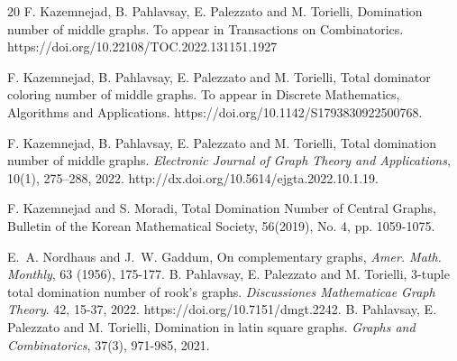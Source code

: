 \documentclass[a4paper,12pt, reqno]{amsart}
\begin{document}
\begin{thebibliography}{20}
 F. Kazemnejad, B. Pahlavsay, E. Palezzato and M. Torielli, Domination number of middle graphs. To appear in Transactions on Combinatorics. https://doi.org/10.22108/TOC.2022.131151.1927

 F. Kazemnejad, B. Pahlavsay, E. Palezzato and M. Torielli, Total dominator coloring number of middle graphs. To appear in Discrete Mathematics, Algorithms and Applications. https://doi.org/10.1142/S1793830922500768.

 F. Kazemnejad, B. Pahlavsay, E. Palezzato and M. Torielli, Total domination number of middle graphs. {\em Electronic Journal of Graph Theory and Applications}, 10(1), 275--288, 2022. http://dx.doi.org/10.5614/ejgta.2022.10.1.19.

 F. Kazemnejad and S. Moradi, Total Domination Number of Central Graphs, Bulletin of the Korean Mathematical Society, 56(2019), No. 4, pp.
1059-1075.

  E.~A. Nordhaus and J.~W. Gaddum, On complementary graphs, {\em Amer. Math. Monthly}, 63 (1956), 175-177.
 B. Pahlavsay, E. Palezzato and M. Torielli, 3-tuple total domination number of rook's graphs. {\em Discussiones Mathematicae Graph Theory}. 42, 15-37, 2022. https://doi.org/10.7151/dmgt.2242.
 B. Pahlavsay, E. Palezzato and M. Torielli, Domination in latin square graphs. {\em Graphs and Combinatorics}, 37(3), 971-985, 2021.




\end{thebibliography}
 
\end{document}
